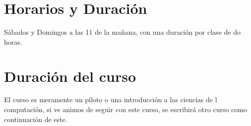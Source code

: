 \documentclass[12pt, letterpaper]{article}
\begin{document}
\section{Horarios y Duración}
Sábados y Domingos a las 11 de la mañana, con una duración por clase de do horas.
\section{Duración del curso}
El curso es meramente un piloto o una introducción a las ciencias de l computación, si ve animos de seguir con este curso, se escribirá otro curso
como continuación de este.
\end{document}
